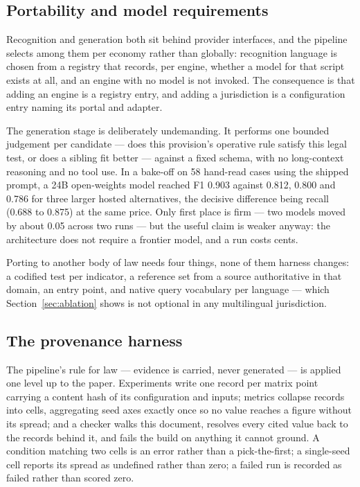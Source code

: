 \documentclass{article}
\begin{document}
\subsection{Portability and model requirements}
\label{sec:portability}

Recognition and generation both sit behind provider interfaces, and the pipeline
selects among them per economy rather than globally: recognition language is
chosen from a registry that records, per engine, whether a model for that script
exists at all, and an engine with no model is not invoked. The consequence is
that adding an engine is a registry entry, and adding a jurisdiction is a
configuration entry naming its portal and adapter.

The generation stage is deliberately undemanding. It performs one bounded
judgement per candidate --- does this provision's operative rule satisfy this
legal test, or does a sibling fit better --- against a fixed schema, with no
long-context reasoning and no tool use. In a bake-off on 58 hand-read cases using
the shipped prompt, a 24B open-weights model reached F1 0.903 against 0.812,
0.800 and 0.786 for three larger hosted alternatives, the decisive difference
being recall (0.688 to 0.875) at the same price. Only first place is firm --- two
models moved by about 0.05 across two runs --- but the useful claim is weaker
anyway: the architecture does not require a frontier model, and a run costs
cents.

Porting to another body of law needs four things, none of them harness changes: a
codified test per indicator, a reference set from a source authoritative in that
domain, an entry point, and native query vocabulary per language --- which
Section~\ref{sec:ablation} shows is not optional in any multilingual
jurisdiction.

\subsection{The provenance harness}
\label{sec:provenance}

The pipeline's rule for law --- evidence is carried, never generated --- is
applied one level up to the paper. Experiments write one record per matrix point
carrying a content hash of its configuration and inputs; metrics collapse
records into cells, aggregating seed axes exactly once so no value reaches a
figure without its spread; and a checker walks this document, resolves every
cited value back to the records behind it, and fails the build on anything it
cannot ground. A condition matching two cells is an error rather than a
pick-the-first; a single-seed cell reports its spread as undefined rather than
zero; a failed run is recorded as failed rather than scored zero.
\end{document}
